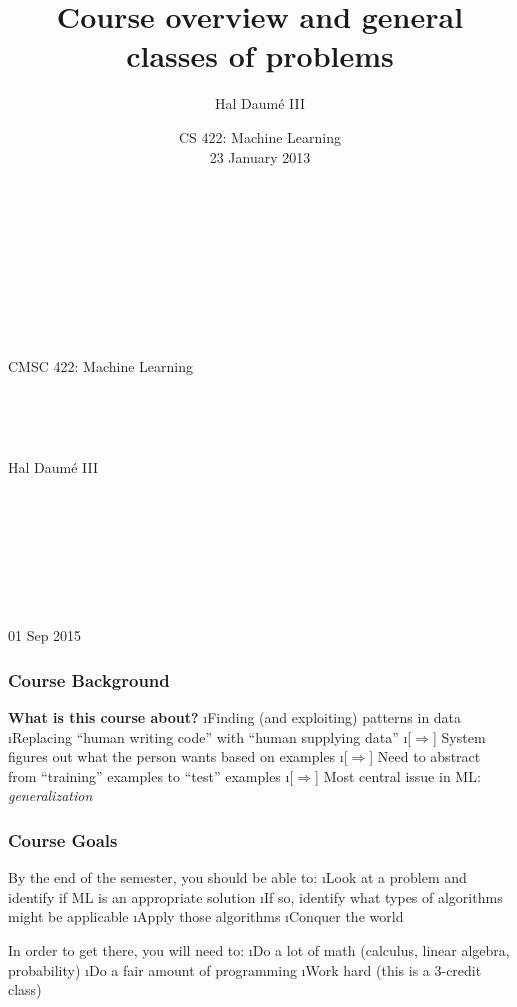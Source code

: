 \documentclass{beamer}
\title[Course Overview] %
{Course overview and general classes of problems}
\author{Hal Daum\'e III} %
\date%
{CS 422: Machine Learning\\\vspace{2em}23 January 2013}
\newcommand{\vsp}{\vspace{1em}}
\begin{document}
\begin{frame}
\frametitle{}
\vsp

~

~


~

~

{\Huge CMSC 422: Machine Learning}

~

~

{\Large Hal Daum\'e III}

~

~


~

~

{\Large 01 Sep 2015}
\end{frame}

\begin{frame}
\frametitle{Course Background}

{\bf What is this course about?}
\bei
\i Finding (and exploiting) patterns in data
\i Replacing ``human writing code'' with ``human supplying data''
\bei
\i[$\Rightarrow$] System figures out what the person wants based on examples
\i[$\Rightarrow$] Need to abstract from ``training'' examples to ``test'' examples
\i[$\Rightarrow$] Most central issue in ML: \emph{generalization}
\eni
\eni

\vsp
{}
\end{frame}



\begin{frame}
\frametitle{Course Goals}

By the end of the semester, you should be able to:
\bei
\i Look at a problem and identify if ML is an appropriate solution
\i If so, identify what types of algorithms might be applicable
\i Apply those algorithms
\i Conquer the world
\eni

\vsp
In order to get there, you will need to:
\bei
\i Do a lot of math (calculus, linear algebra, probability)
\i Do a fair amount of programming
\i Work hard (this is a 3-credit class)
\eni

\end{frame}
\end{document}

